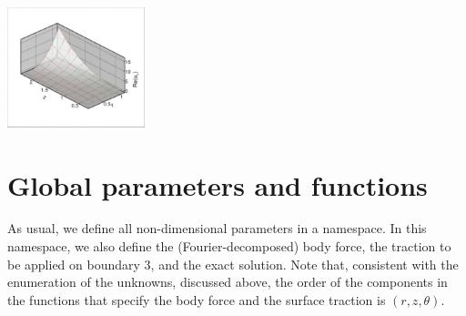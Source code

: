  
\begin{DoxyImage}
\includegraphics[width=0.3\textwidth]{validate_utheta}
\end{DoxyImage}




 

\hypertarget{index_namespace}{}\section{Global parameters and functions}\label{index_namespace}
As usual, we define all non-\/dimensional parameters in a namespace. In this namespace, we also define the (Fourier-\/decomposed) body force, the traction to be applied on boundary 3, and the exact solution. Note that, consistent with the enumeration of the unknowns, discussed above, the order of the components in the functions that specify the body force and the surface traction is $ (r,z,\theta) $.

